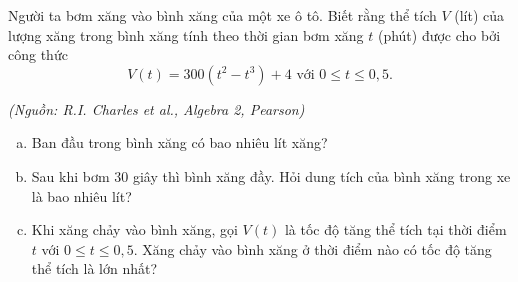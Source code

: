 \begin{ex}
    Người ta bơm xăng vào bình xăng của một xe ô tô. Biết rằng thể tích $V$ (lít) của lượng xăng trong bình xăng tính theo thời gian bơm xăng $t$ (phút) được cho bởi công thức $$V(t)=300(t^2-t^3)+4 \text{ với } 0\le t\le 0{,}5.$$
    \begin{flushright}
        \textit{(Nguồn: R.I. Charles et al., Algebra 2, Pearson)}
    \end{flushright}
    \begin{enumerate}[a)]
        \item Ban đầu trong bình xăng có bao nhiêu lít xăng?
        \item Sau khi bơm $30$ giây thì bình xăng đầy. Hỏi dung tích của bình xăng trong xe là bao nhiêu lít?
        \item Khi xăng chảy vào bình xăng, gọi $V(t)$ là tốc độ tăng thể tích tại thời điểm $t$ với $0\le t\le 0{,}5$. Xăng chảy vào bình xăng ở thời điểm nào có tốc độ tăng thể tích là lớn nhất?
    \end{enumerate}
    \shortans{}
\end{ex}
